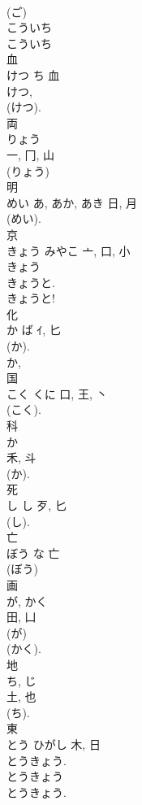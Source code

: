 \documentclass[8pt]{extreport}
\begin{document}
\begin{CJK}{UTF8}{min}
\\	(ご) 
\\	こういち 
\\	こういち 
\\	血	
\\	けつ	ち	血	
\\	けつ, 
\\	(けつ).
\\	両	
\\	りょう	
\\	一, 冂, 山	
\\	(りょう) 
\\	明	
\\	めい	あ, あか, あき	日, 月	
\\	(めい).	
\\	京	
\\	きょう	みやこ	亠, 口, 小	
\\	きょう 
\\	きょうと. 
\\	きょうと!	
\\	化	
\\	か	ば	ｲ, 匕	
\\	(か).	
\\	か, 
\\	国	
\\	こく	くに	口, 王, 丶	
\\	(こく). 
\\	科	
\\	か	
\\	禾, 斗	
\\	(か). 
\\	死	
\\	し	し	歹, 匕	
\\	(し). 
\\	亡	
\\	ぼう	な	亡	
\\	(ぼう) 
\\	画	
\\	が, かく	
\\	田, 凵		
\\	(が) 
\\	(かく). 
\\	地	
\\	ち, じ	
\\	土, 也	
\\	(ち). 
\\	東	
\\	とう	ひがし	木, 日	
\\	とうきょう. 
\\	とうきょう 
\\	とうきょう. 

\end{CJK}
\end{document}
